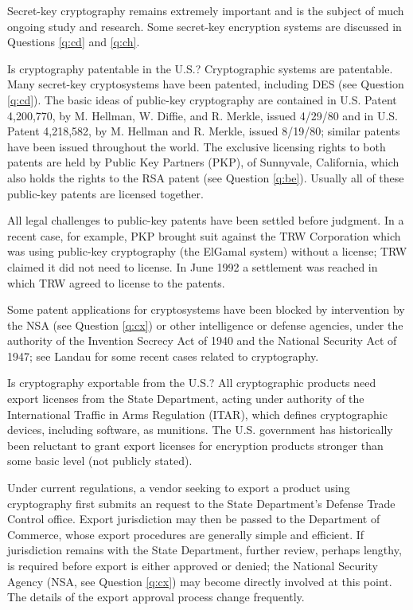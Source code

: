 Secret-key cryptography remains extremely important and is the subject of
much ongoing study and research. Some secret-key encryption systems are 
discussed in Questions \ref{q:cd} and \ref{q:ch}.

{Is cryptography patentable in the U.S.?}
Cryptographic systems are patentable. Many secret-key cryptosystems have
been patented, including DES (see Question \ref{q:cd}). The basic ideas 
of public-key cryptography are contained in U.S. Patent 4,200,770, by M.
Hellman, W. Diffie, and R. Merkle, issued 4/29/80 and in U.S. Patent 
4,218,582, by M. Hellman and R. Merkle, issued 8/19/80; similar patents have 
been issued throughout the world. The exclusive licensing rights to both 
patents are held by Public Key Partners (PKP), of Sunnyvale, California, 
which also holds the rights to the RSA patent (see Question \ref{q:be}). 
Usually all of these public-key patents are licensed together. 

All legal challenges to public-key patents have been settled before
judgment. In a recent case, for example, PKP brought suit against the TRW 
Corporation which was using public-key cryptography (the ElGamal system) 
without a license; TRW claimed it did not need to license. In June 1992 a 
settlement was reached in which TRW agreed to license to the patents.

Some patent applications for cryptosystems have been blocked by intervention 
by the NSA (see Question \ref{q:cx}) or other intelligence or defense 
agencies, under the authority of the Invention Secrecy Act of 1940 and the 
National Security Act of 1947; see Landau \cite{landau} for some recent 
cases related to cryptography.

{Is cryptography exportable from the U.S.?}
All cryptographic products need export licenses from the State Department, 
acting under authority of the International Traffic in Arms Regulation 
(ITAR), which defines cryptographic devices, including software, as 
munitions. The U.S. government has historically been reluctant to grant 
export licenses for encryption products stronger than some basic level 
(not publicly stated). 

Under current regulations, a vendor seeking to export a product using 
cryptography first submits an request to the State Department's Defense
Trade Control office. Export jurisdiction may then be passed to the
Department of Commerce, whose export procedures are generally simple and
efficient. If jurisdiction remains with the State Department, further
review, perhaps lengthy, is required before export is either approved or
denied; the National Security Agency (NSA, see Question \ref{q:cx}) may 
become directly involved at this point. The details of the export approval 
process change frequently.

